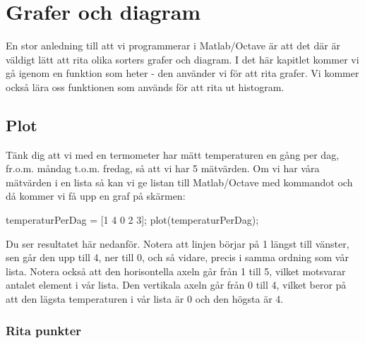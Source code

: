 %
%

\chapter{Grafer och diagram}\label{ch:grafer}
En stor anledning till att vi programmerar i Matlab/Octave är att det där är väldigt lätt att rita olika sorters grafer och diagram. I det här kapitlet kommer vi gå igenom en funktion som heter  - den använder vi för att rita grafer. Vi kommer också lära oss funktionen  som används för att rita ut histogram.


\section{Plot}

Tänk dig att vi med en termometer har mätt temperaturen en gång per dag, fr.o.m. måndag t.o.m. fredag, så att vi har 5 mätvärden. Om vi har våra mätvärden i en lista så kan vi ge listan till Matlab/Octave med kommandot  och då kommer vi få upp en graf på skärmen:

\begin{matlab}[caption={Vår första graf},label={}]
temperaturPerDag = [1 4 0 2 3];
plot(temperaturPerDag);
\end{matlab}

Du ser resultatet här nedanför. Notera att linjen börjar på 1 längst till vänster, sen går den upp till 4, ner till 0, och så vidare, precis i samma ordning som vår lista. Notera också att den horisontella axeln går från 1 till 5, vilket motsvarar antalet element i vår lista. Den vertikala axeln går från 0 till 4, vilket beror på att den lägsta temperaturen i vår lista är 0 och den högsta är 4.
\newpage
{}

\subsection{Rita punkter}

